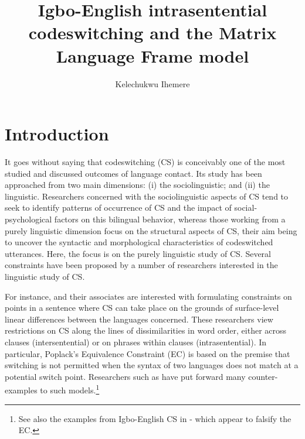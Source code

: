 \documentclass[output=paper]{langsci/langscibook}
\title{Igbo-English intrasentential codeswitching and the Matrix Language Frame model}
\author{%
 Kelechukwu Ihemere \affiliation{University of Westminster, London UK}
}
\begin{document}



 


\section{Introduction}\label{sec:ihemere:1}

It goes without saying that codeswitching (CS) is conceivably one of the most studied and discussed outcomes of language contact. Its study has been approached from two main dimensions: (i) the sociolinguistic; and (ii) the linguistic. Researchers concerned with the sociolinguistic aspects of CS tend to seek to identify patterns of occurrence of CS and the impact of social-psychological factors on this bilingual behavior, whereas those working from a purely linguistic dimension focus on the structural aspects of CS, their aim being to uncover the syntactic and morphological characteristics of codeswitched utterances. Here, the focus is on the purely linguistic study of CS. Several constraints have been proposed by a number of researchers interested in the linguistic study of CS.  

For instance, \citet{PoplackMeechan1998} and their associates are interested with formulating constraints on points in a sentence where CS can take place on the grounds of surface-level linear differences between the languages concerned. These researchers view restrictions on CS along the lines of dissimilarities in word order, either across clauses (intersentential) or on phrases within clauses (intrasentential). In particular, Poplack’s Equivalence Constraint (EC) is based on the premise that switching is not permitted when the syntax of two languages does not match at a potential switch point. Researchers such as \citet{Bhatt2001} have put forward many counter-examples to such models.\footnote{See also the examples from Igbo-English CS in - which appear to falsify the EC.} 
\end{document}
